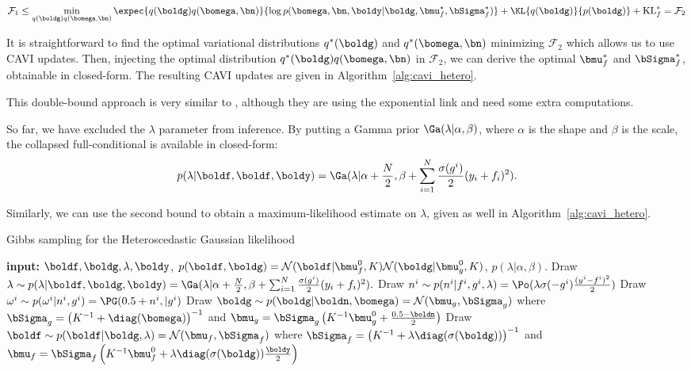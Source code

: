 \begin{align*}
    \mathcal{F}_1 \leq \min_{q(\boldg)q(\bomega,\bn)} \expec{q(\boldg)q(\bomega,\bn)}{\log p(\bomega,\bn,\boldy|\boldg,\bmu_f^*,\bSigma_f^*)} + \KL{q(\boldg)}{p(\boldg)} + \operatorname{KL}_f^*=\mathcal{F}_2
\end{align*}

It is straightforward to find the optimal variational distributions $q^*(\boldg)$ and $q^*(\bomega,\bn)$ minimizing $\mathcal{F}_2$ which allows us to use \ac{CAVI} updates.
Then, injecting the optimal distribution $q^*(\boldg)q(\bomega,\bn)$ in $\mathcal{F}_2$, we can derive the optimal $\bmu_f^*$ and $\bSigma_f^*$, obtainable in closed-form.
The resulting \ac{CAVI} updates are given in Algorithm~\ref{alg:cavi_hetero}.

This double-bound approach is very similar to \citet{lazaro2011variational}, although they are using the exponential link and need some extra computations.

So far, we have excluded the $\lambda$ parameter from inference.
By putting a Gamma prior $\Ga(\lambda|\alpha, \beta)$, where $\alpha$ is the shape and $\beta$ is the scale, the collapsed full-conditional is available in closed-form:
\begin{align*}
    p(\lambda|\boldf, \boldf, \boldy) = \Ga(\lambda| \alpha + \frac{N}{2}, \beta + \sum_{i=1}^N \frac{\sigma(g^i)}{2}(y_i + f_i)^2).
\end{align*}

Similarly, we can use the second bound to obtain a maximum-likelihood estimate on $\lambda$, given as well in Algorithm~\ref{alg:cavi_hetero}.

\begin{algorithm}[H]
    \caption{Gibbs sampling for the Heteroscedastic Gaussian likelihood}
    \begin{algorithmic}
        \State \textbf{input:} $\boldf,\boldg, \lambda, \boldy$, $p(\boldf,\boldg) = \mathcal{N}(\boldf|\bmu^0_f, K)\mathcal{N}(\boldg|\bmu^0_g, K)$, $p(\lambda|\alpha,\beta)$.
            \State Draw $\lambda \sim p(\lambda|\boldf,\boldg,\boldy) = \Ga(\lambda| \alpha + \frac{N}{2}, \beta + \sum_{i=1}^N \frac{\sigma(g^i)}{2}(y_i + f_i)^2).$
            \State Draw $n^i \sim p(n^i|f^i, g^i, \lambda) = \Po(\lambda \sigma(-g^i) \frac{(y^i - f^i)^2}{2})$
            \State Draw $\omega^i \sim p(\omega^i|n^i,g^i) = \PG(0.5 + n^i, |g^i)$
            \State Draw $\boldg \sim p(\boldg|\boldn, \bomega) = \mathcal{N}(\bmu_g,\bSigma_g)$
            \State \quad where $\bSigma_g=  \left(K^{-1} + \diag(\bomega)\right)^{-1}$ and $\bmu_g = \bSigma_g\left(K^{-1}\bmu^0_g + \frac{0.5 - \boldn}{2}\right)$
            \State Draw $\boldf \sim p(\boldf | \boldg, \lambda) = \mathcal{N}(\bmu_f,\bSigma_f)$
            \State \quad where $\bSigma_f = \left(K^{-1} + \lambda\diag(\sigma(\boldg))\right)^{-1}$ and $\bmu_f = \bSigma_f\left(K^{-1}\bmu_f^0 + \lambda\diag(\sigma(\boldg))\frac{\boldy}{2}\right)$
        \EndFor
    \end{algorithmic}
    \label{alg:gibbs_hetero}
\end{algorithm}

